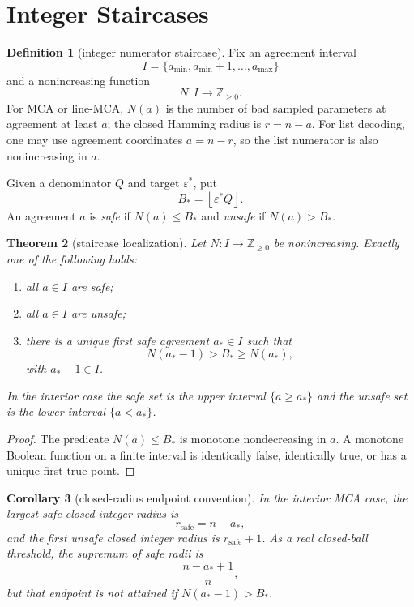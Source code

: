 \documentclass[11pt]{article}
\newtheorem{theorem}{Theorem}[section]
\newtheorem{corollary}[theorem]{Corollary}
\theoremstyle{definition}
\newtheorem{definition}[theorem]{Definition}
\theoremstyle{remark}
\newcommand{\floor}[1]{\left\lfloor #1\right\rfloor}
\begin{document}
\section{Integer Staircases}

\begin{definition}[integer numerator staircase]
Fix an agreement interval
\[
        I=\{a_{\min},a_{\min}+1,\ldots,a_{\max}\}
\]
and a nonincreasing function
\[
        N:I\longrightarrow \mathbb Z_{\ge 0}.
\]
For MCA or line-MCA, $N(a)$ is the number of bad sampled parameters at
agreement at least $a$; the closed Hamming radius is $r=n-a$.  For list
decoding, one may use agreement coordinates $a=n-r$, so the list numerator is
also nonincreasing in $a$.

Given a denominator $Q$ and target $\varepsilon^*$, put
\[
        B_*=\floor{\varepsilon^* Q}.
\]
An agreement $a$ is \emph{safe} if $N(a)\le B_*$ and \emph{unsafe} if
$N(a)>B_*$.
\end{definition}

\begin{theorem}[staircase localization]\label{thm:staircase}
Let $N:I\to\mathbb Z_{\ge0}$ be nonincreasing.  Exactly one of the following
holds:
\begin{enumerate}[label=(\roman*)]
        \item all $a\in I$ are safe;
        \item all $a\in I$ are unsafe;
        \item there is a unique first safe agreement $a_*\in I$ such that
        \[
                N(a_*-1)>B_*\ge N(a_*),
        \]
        with $a_*-1\in I$.
\end{enumerate}
In the interior case the safe set is the upper interval $\{a\ge a_*\}$ and the
unsafe set is the lower interval $\{a<a_*\}$.
\end{theorem}

\begin{proof}
The predicate $N(a)\le B_*$ is monotone nondecreasing in $a$.  A monotone
Boolean function on a finite interval is identically false, identically true,
or has a unique first true point.
\end{proof}

\begin{corollary}[closed-radius endpoint convention]\label{cor:endpoint}
In the interior MCA case, the largest safe closed integer radius is
\[
        r_{\mathrm{safe}}=n-a_*,
\]
and the first unsafe closed integer radius is $r_{\mathrm{safe}}+1$.  As a
real closed-ball threshold, the supremum of safe radii is
\[
        \frac{n-a_*+1}{n},
\]
but that endpoint is not attained if $N(a_*-1)>B_*$.
\end{corollary}
\end{document}
